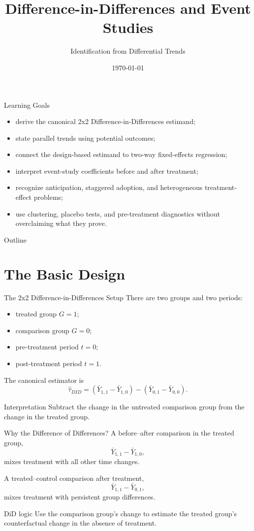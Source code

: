 \documentclass[aspectratio=169,11pt]{beamer}
\title[Difference-in-Differences]{Difference-in-Differences and Event Studies}
\subtitle{Identification from Differential Trends}
\date{\today}
\begin{document}
\begin{frame}
\titlepage
\end{frame}

\begin{frame}{Learning Goals}
\begin{itemize}
\item derive the canonical 2x2 Difference-in-Differences estimand;
\item state parallel trends using potential outcomes;
\item connect the design-based estimand to two-way fixed-effects regression;
\item interpret event-study coefficients before and after treatment;
\item recognize anticipation, staggered adoption, and heterogeneous treatment-effect problems;
\item use clustering, placebo tests, and pre-treatment diagnostics without overclaiming what they prove.
\end{itemize}
\end{frame}

\begin{frame}{Outline}
\tableofcontents
\end{frame}

\section{The Basic Design}

\begin{frame}{The 2x2 Difference-in-Differences Setup}
There are two groups and two periods:
\begin{itemize}
\item treated group \(G=1\);
\item comparison group \(G=0\);
\item pre-treatment period \(t=0\);
\item post-treatment period \(t=1\).
\end{itemize}

The canonical estimator is
\[
\widehat{\tau}_{DID}
=
(\bar Y_{1,1}-\bar Y_{1,0})
-
(\bar Y_{0,1}-\bar Y_{0,0}).
\]

\begin{block}{Interpretation}
Subtract the change in the untreated comparison group from the change in the treated group.
\end{block}
\end{frame}

\begin{frame}{Why the Difference of Differences?}
A before--after comparison in the treated group,
\[
\bar Y_{1,1}-\bar Y_{1,0},
\]
mixes treatment with all other time changes.

A treated--control comparison after treatment,
\[
\bar Y_{1,1}-\bar Y_{0,1},
\]
mixes treatment with persistent group differences.

\begin{alertblock}{DiD logic}
Use the comparison group's change to estimate the treated group's counterfactual change in the absence of treatment.
\end{alertblock}
\end{frame}
\end{document}

